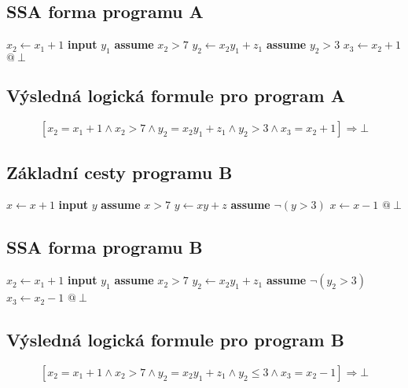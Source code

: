 \documentclass{article}
\begin{document}
\subsection{SSA forma programu A}
$x_2 \leftarrow x_1 + 1$ \newline
\textbf{input} $y_1$ \newline
\textbf{assume} $x_2 > 7$ \newline
$y_2 \leftarrow x_2y_1 + z_1$ \newline
\textbf{assume} $y_2 > 3$ \newline
$x_3 \leftarrow x_2 + 1$ \newline
$@\ \bot$

\subsection{Výsledná logická formule pro program A}
$$[x_2 = x_1 + 1 \wedge x_2 > 7 \wedge y_2 = x_2y_1 + z_1 \wedge y_2 > 3 \wedge  x_3 = x_2 + 1] \Rightarrow \bot$$
\subsection{Základní cesty programu B }
$x \leftarrow x + 1$ \newline
\textbf{input} $y$ \newline
\textbf{assume} $x > 7$ \newline
$y \leftarrow xy + z$ \newline
\textbf{assume} $\neg(y > 3)$ \newline
$x \leftarrow x - 1$ \newline
$@\ \bot$


\subsection{SSA forma programu B}
$x_2 \leftarrow x_1 + 1$ \newline
\textbf{input} $y_1$ \newline
\textbf{assume} $x_2 > 7$ \newline
$y_2 \leftarrow x_2y_1 + z_1$ \newline
\textbf{assume} $\neg(y_2 > 3)$ \newline
$x_3 \leftarrow x_2 - 1$ \newline
$@\ \bot$

\subsection{Výsledná logická formule pro program B}
$$[x_2 = x_1 + 1 \wedge x_2 > 7 \wedge y_2 = x_2y_1 + z_1 \wedge y_2 \leq 3 \wedge  x_3 = x_2 - 1] \Rightarrow \bot$$
\end{document}

